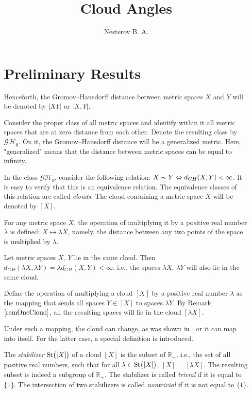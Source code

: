 \documentclass[11pt,twoside
]{article}
\begin{document}
\title{Cloud Angles}
\author{Nesterov B. A.}
\date{}
\newpage

\section{Preliminary Results}
Henceforth, the Gromov--Hausdorff distance between metric spaces $X$
and $Y$ will be denoted by $|XY|$ or \( | X,Y | \).

Consider the proper class of all metric spaces and identify within it
all metric spaces that are at zero distance from each other. Denote
the resulting class by $\mathcal{GH}_0$. On it, the Gromov--Hausdorff
distance will be a generalized metric. Here, "generalized" means that
the distance between metric spaces can be equal to infinity.
\begin{definition} In the class $\mathcal{GH}_{0}$, consider the following
  relation: $X \thicksim Y \Leftrightarrow d_{GH}(X, Y) < \infty$. It
  is easy to verify that this is an equivalence relation. The
  equivalence classes of this relation are called \emph{clouds}. The
  cloud containing a metric space $X$ will be denoted by $[X]$.
\end{definition}

For any metric space $X$, the operation of multiplying it by a
positive real number $\lambda$ is defined: $X\mapsto \lambda X$,
namely, the distance between any two points of the space is
multiplied by $\lambda$.
\begin{remark} Let metric spaces $X$, $Y$ lie in the same cloud. Then
  $d_{GH}(\lambda X, \lambda Y) = \lambda d_{GH}(X,Y) < \infty$,
  i.e., the spaces $\lambda X$, $\lambda Y$ will also lie in the same cloud.
  \label{remOneCloud}
\end{remark}
\begin{definition} Define the operation of multiplying a cloud $[X]$ by a
  positive real number $\lambda$ as the mapping that sends all spaces
  $Y \in [X]$ to spaces $\lambda Y$. By Remark $\ref{remOneCloud}$,
  all the resulting spaces will lie in the cloud $[\lambda X]$.
\end{definition}
Under such a mapping, the cloud can change, as was shown in , or it
can map into itself. For the latter case, a special definition is introduced.
\begin{definition}
  The \emph{stabilizer} $\operatorname{St}\bigl([X]\bigr)$ of a cloud $[X]$
  is the subset of $\mathbb{R}_+$, i.e., the set of all positive real
  numbers, such that for all $\lambda \in \operatorname{St}\bigl([X]\bigr)$, $[X] =
  [\lambda X]$. The resulting subset is indeed a subgroup of
  $\mathbb{R}_+$. The stabilizer is called \emph{trivial} if it
  is equal to $\{1\}$. The intersection of two stabilizers is
  called \emph{nontrivial} if it is not equal to \( \{1\} \).
\end{definition}
\end{document}
